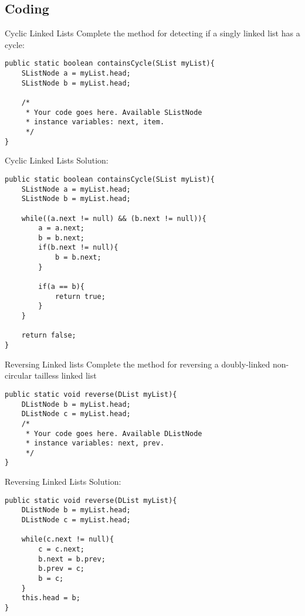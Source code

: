 \documentclass[9pt]{beamer}
\begin{document}
\subsection{Coding}
\begin{frame}[fragile]{Cyclic Linked Lists}
  Complete the method for detecting if a singly linked list has a cycle:

  \begin{lstlisting}
public static boolean containsCycle(SList myList){
    SListNode a = myList.head;
    SListNode b = myList.head;

    /*
     * Your code goes here. Available SListNode
     * instance variables: next, item.
     */
}
  \end{lstlisting}
\end{frame}

\begin{frame}[fragile]{Cyclic Linked Lists}
  Solution:

  \begin{lstlisting}
public static boolean containsCycle(SList myList){
    SListNode a = myList.head;
    SListNode b = myList.head;

    while((a.next != null) && (b.next != null)){
        a = a.next;
        b = b.next;
        if(b.next != null){
            b = b.next;
        }

        if(a == b){
            return true;
        }
    }

    return false;
}
  \end{lstlisting}
\end{frame}

\begin{frame}[fragile]{Reversing Linked lists}
  Complete the method for reversing a doubly-linked non-circular tailless
  linked list

  \begin{lstlisting}
public static void reverse(DList myList){
    DListNode b = myList.head;
    DListNode c = myList.head;
    /*
     * Your code goes here. Available DListNode
     * instance variables: next, prev.
     */
}
  \end{lstlisting}
\end{frame}

\begin{frame}[fragile]{Reversing Linked Lists}
  Solution:

  \begin{lstlisting}
public static void reverse(DList myList){
    DListNode b = myList.head;
    DListNode c = myList.head;

    while(c.next != null){
        c = c.next;
        b.next = b.prev;
        b.prev = c;
        b = c;
    }
    this.head = b;
}
  \end{lstlisting}
\end{frame}
\end{document}
